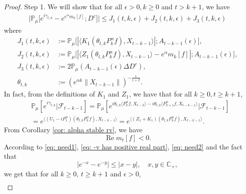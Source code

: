 \documentclass[12pt,a4paper]{amsart}
\theoremstyle{plain}
\theoremstyle{definition}
\numberwithin{equation}{section}
\begin{document}
\begin{proof}
    Step 1. We will show that for all $\epsilon > 0, k\geq 0$ and $t>k+1$, we have
\begin{equation}\begin{split}
    \big|\mathbb{P}_{\mu}\big[e^{i\gamma_{t,k}}-e^{e^{\alpha}m_k[f]}; D^c\big]\big|
    \leq J_1(t,k,\epsilon)+J_2(t,k,\epsilon)+J_3(t,k,\epsilon)
\end{split}\end{equation}
    where
\begin{equation}\begin{split}
\label{eq: Def of Ji}
    J_1(t,k,\epsilon)
    &:= \mathbb{P}_{\mu}\big[|\langle K_1(\theta_{t,k}P^\alpha_k f), X_{t-k-1}\rangle|; A_{t-k-1}(\epsilon) \big],
    \\ J_2(t,k,\epsilon)
    &:= \mathbb{P}_{\mu}\big[|\langle Z_1(\theta_{t,k}P^\alpha_k f),X_{t-k-1}\rangle-e^{\alpha}m_k[f]|; A_{t-k-1}(\epsilon)\big],
    \\ J_3(t,k, \epsilon)
    &:=2\mathbb{P}_{\mu}(A_{t-k-1}(\epsilon)\Delta D^c),
    \\\theta_{t,k}
    &:= (e^{\alpha k}\|X_{t-k-1}\|)^{-\frac{1}{1+\beta}}.
\end{split}\end{equation}
In fact, from the definitions of $K_1$ and $Z_1$, we have that for all
$k\geq 0, t\geq k+1$,
\begin{equation}\begin{split}
\label{eq: need1}
    &\mathbb{P}_{\mu}[e^{i\gamma_{t,k}}|\mathscr{F}_{t-k-1}]
    =\mathbb{P}_{\mu}[e^{i\theta_{t,k}\langle P^\alpha_k f,X_{t-k}\rangle-i\theta_{t,k}\langle P^\alpha_{k+1} f, X_{t-k-1}\rangle}|\mathscr{F}_{t-k-1}]
    \\&=e^{\langle (U_1 - iP^\alpha_1 ) (\theta_{t,k}P^\alpha_k f),X_{t-k-1}\rangle}
    =e^{\langle (Z_1 + K_1) (\theta_{t,k}P^\alpha_k f),X_{t-k-1}\rangle}.
\end{split}\end{equation}
    From Corollary \ref{cor: alpha stable rv}, we have
\begin{equation}
\label{eq: need2}
    \operatorname {Re} m_t[f] < 0.
\end{equation}
    According to \eqref{eq: need1}, \eqref{eq: -v has positive real part}, \eqref{eq: need2} and the fact that
\[
    |e^{-x} - e^{-y}| \leq |x-y|,\quad x,y \in \mathbb C_+,
\]
    we get that for all $k\geq 0$, $t\geq k+1$ and $\epsilon> 0$,
\begin{equation}\begin{split}
\label{eq: inequality that will used later}

\end{split}
\end{equation}
\end{proof}
\end{document}
